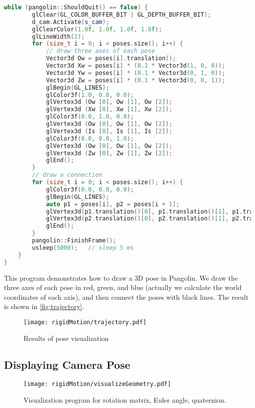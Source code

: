 \begin{lstlisting}[language=c++,caption=slambook2/ch3/examples/plotTrajectory.cpp]
	while (pangolin::ShouldQuit() == false) {
		glClear(GL_COLOR_BUFFER_BIT | GL_DEPTH_BUFFER_BIT);
		d_cam.Activate(s_cam);
		glClearColor(1.0f, 1.0f, 1.0f, 1.0f);
		glLineWidth(2);
		for (size_t i = 0; i < poses.size(); i++) {
			// draw three axes of each pose
			Vector3d Ow = poses[i].translation();
			Vector3d Xw = poses[i] * (0.1 * Vector3d(1, 0, 0));
			Vector3d Yw = poses[i] * (0.1 * Vector3d(0, 1, 0));
			Vector3d Zw = poses[i] * (0.1 * Vector3d(0, 0, 1));
			glBegin(GL_LINES);
			glColor3f(1.0, 0.0, 0.0);
			glVertex3d (Ow [0], Ow [1], Ow [2]);
			glVertex3d (Xw [0], Xw [1], Xw [2]);
			glColor3f(0.0, 1.0, 0.0);
			glVertex3d (Ow [0], Ow [1], Ow [2]);
			glVertex3d (Is [0], Is [1], Is [2]);
			glColor3f(0.0, 0.0, 1.0);
			glVertex3d (Ow [0], Ow [1], Ow [2]);
			glVertex3d (Zw [0], Zw [1], Zw [2]);
			glEnd();
		}
		// draw a connection
		for (size_t i = 0; i < poses.size(); i++) {
			glColor3f(0.0, 0.0, 0.0);
			glBegin(GL_LINES);
			auto p1 = poses[i], p2 = poses[i + 1];
			glVertex3d(p1.translation()[0], p1.translation()[1], p1.translation()[2]);
			glVertex3d(p2.translation()[0], p2.translation()[1], p2.translation()[2]);
			glEnd();
		}
		pangolin::FinishFrame();
		usleep(5000);   // sleep 5 ms
	}
}
\end{lstlisting}

This program demonstrates how to draw a 3D pose in Pangolin. We draw the three axes of each pose in red, green, and blue (actually we calculate the world coordinates of each axis), and then connect the poses with black lines. The result is shown in \autoref {fig:trajectory}.

\begin{figure}[!htp]
	\centering
	\texttt{[image: rigidMotion/trajectory.pdf]}
	\caption {Results of pose visualization}
	\label{fig:trajectory}
\end{figure}

\subsection{Displaying Camera Pose}
\begin{figure}[!htp]
	\centering
	\texttt{[image: rigidMotion/visualizeGeometry.pdf]}
	\caption {Visualization program for rotation matrix, Euler angle, quaternion. }
	\label{fig:visualizeGeometry}
\end{figure}

